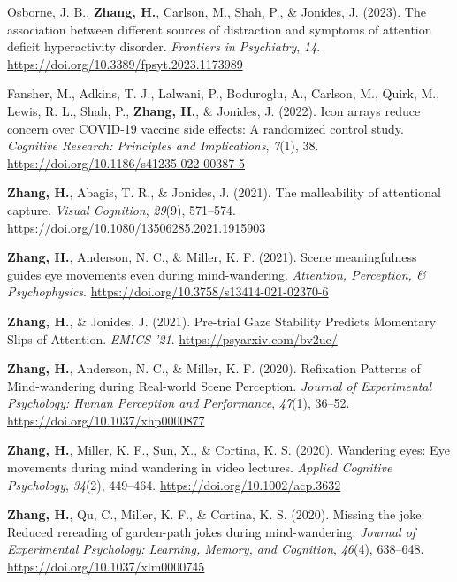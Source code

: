 \documentclass[11pt,a4paper,]{awesome-cv}
\begin{document}
\leavevmode{}%
Osborne, J. B., \textbf{Zhang, H.}, Carlson, M., Shah, P., \& Jonides,
J. (2023). The association between different sources of distraction and
symptoms of attention deficit hyperactivity disorder. \emph{Frontiers in
Psychiatry}, \emph{14}. \url{https://doi.org/10.3389/fpsyt.2023.1173989}

\leavevmode{}%
Fansher, M., Adkins, T. J., Lalwani, P., Boduroglu, A., Carlson, M.,
Quirk, M., Lewis, R. L., Shah, P., \textbf{Zhang, H.}, \& Jonides, J.
(2022). Icon arrays reduce concern over COVID-19 vaccine side effects: A
randomized control study. \emph{Cognitive Research: Principles and
Implications}, \emph{7}(1), 38.
\url{https://doi.org/10.1186/s41235-022-00387-5}

\leavevmode{}%
\textbf{Zhang, H.}, Abagis, T. R., \& Jonides, J. (2021). The
malleability of attentional capture. \emph{Visual Cognition},
\emph{29}(9), 571--574.
\url{https://doi.org/10.1080/13506285.2021.1915903}

\leavevmode{}%
\textbf{Zhang, H.}, Anderson, N. C., \& Miller, K. F. (2021). Scene
meaningfulness guides eye movements even during mind-wandering.
\emph{Attention, Perception, \& Psychophysics}.
\url{https://doi.org/10.3758/s13414-021-02370-6}

\leavevmode{}%
\textbf{Zhang, H.}, \& Jonides, J. (2021). Pre-trial Gaze Stability
Predicts Momentary Slips of Attention. \emph{EMICS '21}.
\url{https://psyarxiv.com/bv2uc/}

\leavevmode{}%
\textbf{Zhang, H.}, Anderson, N. C., \& Miller, K. F. (2020). Refixation
Patterns of Mind-wandering during Real-world Scene Perception.
\emph{Journal of Experimental Psychology: Human Perception and
Performance}, \emph{47}(1), 36--52.
\url{https://doi.org/10.1037/xhp0000877}

\leavevmode{}%
\textbf{Zhang, H.}, Miller, K. F., Sun, X., \& Cortina, K. S. (2020).
Wandering eyes: Eye movements during mind wandering in video lectures.
\emph{Applied Cognitive Psychology}, \emph{34}(2), 449--464.
\url{https://doi.org/10.1002/acp.3632}

\leavevmode{}%
\textbf{Zhang, H.}, Qu, C., Miller, K. F., \& Cortina, K. S. (2020).
Missing the joke: Reduced rereading of garden-path jokes during
mind-wandering. \emph{Journal of Experimental Psychology: Learning,
Memory, and Cognition}, \emph{46}(4), 638--648.
\url{https://doi.org/10.1037/xlm0000745}
\end{document}
